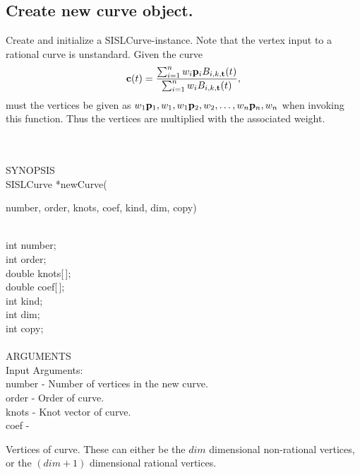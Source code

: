 \subsection{Create new curve object.} \label{sec:newCurve}
\begin{minipg1}
  Create and initialize a SISLCurve-instance. Note that the vertex input to a
  rational curve is unstandard. Given the curve
  $$
{\bf c}(t) = {\sum_{i=1}^{n} w_i {\bf p}_{i} B_{i,k,{\bf t}}(t)
                 \over
                 \sum_{i=1}^{n} w_i B_{i,k,{\bf t}}(t)},
$$
must the vertices be given as
${w_1  {\bf p}_1, w_1, w_1  {\bf p}_2, w_2, \ldots,
  w_n  {\bf p}_n, w_n}$ when invoking this function. Thus the vertices are multiplied with the
associated weight.
\end{minipg1} \\ \\
SYNOPSIS\\
        \>SISLCurve *newCurve(\begin{minipg3}
        {\fov number}, {\fov order}, {\fov knots}, {\fov coef}, {\fov kind}, {\fov dim}, {\fov copy})
                \end{minipg3}\\[0.3ex]
                \>\>    int    \>       {\fov number};\\
                \>\>    int    \>       {\fov order};\\
                \>\>    double \>       {\fov knots}[\,];\\
                \>\>    double \>       {\fov coef}[\,];\\
                \>\>    int    \>       {\fov kind};\\
                \>\>    int    \>       {\fov dim};\\
                \>\>    int    \>       {\fov copy};\\
\\
ARGUMENTS\\
        \>Input Arguments:\\
        \>\>    {\fov number}   \> - \> Number of vertices in the new curve.\\
        \>\>    {\fov order} \> - \> Order of curve.\\
        \>\>    {\fov knots} \> - \> Knot vector of curve.\\
        \>\>    {\fov coef}  \> - \> \begin{minipg2}
                      Vertices of curve. These can either be the $dim$
                      \mbox{dimensional}
                      non-rational vertices, or the $(dim+1)$ dimensional rational
                      vertices.
                                     \end{minipg2}\\[0.8ex]
